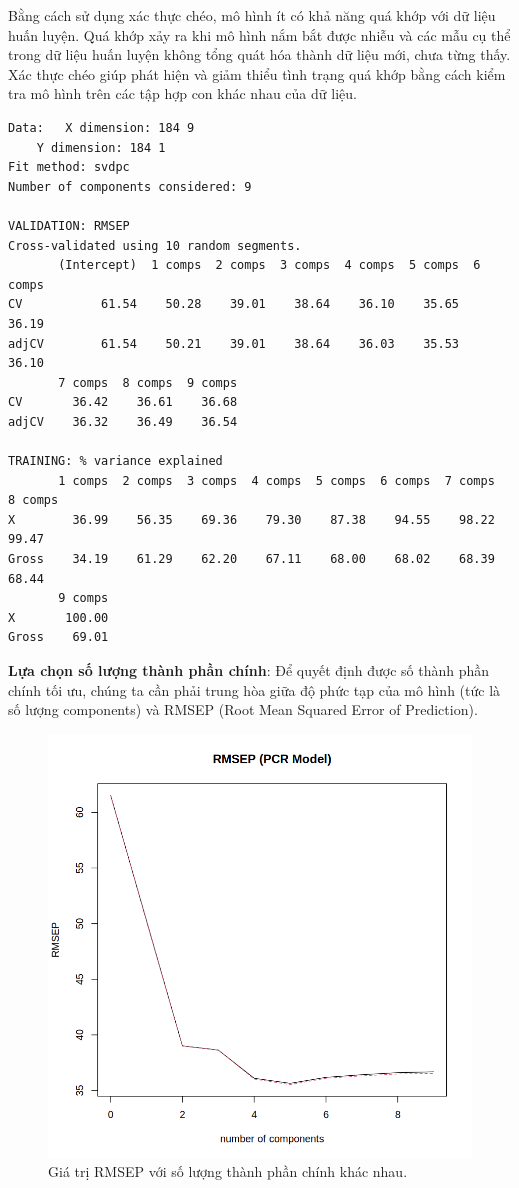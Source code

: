 Bằng cách sử dụng xác thực chéo, mô hình ít có khả năng quá khớp với dữ liệu huấn luyện. Quá khớp xảy ra khi mô hình nắm bắt được nhiễu và các mẫu cụ thể trong dữ liệu huấn luyện không tổng quát hóa thành dữ liệu mới, chưa từng thấy. Xác thực chéo giúp phát hiện và giảm thiểu tình trạng quá khớp bằng cách kiểm tra mô hình trên các tập hợp con khác nhau của dữ liệu.

\begin{lstlisting}
Data: 	X dimension: 184 9 
	Y dimension: 184 1
Fit method: svdpc
Number of components considered: 9

VALIDATION: RMSEP
Cross-validated using 10 random segments.
       (Intercept)  1 comps  2 comps  3 comps  4 comps  5 comps  6 comps
CV           61.54    50.28    39.01    38.64    36.10    35.65    36.19
adjCV        61.54    50.21    39.01    38.64    36.03    35.53    36.10
       7 comps  8 comps  9 comps
CV       36.42    36.61    36.68
adjCV    36.32    36.49    36.54

TRAINING: % variance explained
       1 comps  2 comps  3 comps  4 comps  5 comps  6 comps  7 comps  8 comps
X        36.99    56.35    69.36    79.30    87.38    94.55    98.22    99.47
Gross    34.19    61.29    62.20    67.11    68.00    68.02    68.39    68.44
       9 comps
X       100.00
Gross    69.01
\end{lstlisting}

\textbf{Lựa chọn số lượng thành phần chính}: Để quyết định được số thành phần chính tối ưu, chúng ta cần phải trung hòa giữa độ phức tạp của mô hình (tức là số lượng components) và RMSEP (Root Mean Squared Error of Prediction).

\begin{figure}[H]
    \centering
    \includegraphics[width=0.75\columnwidth]{csm_figures/pcr_part01.png}
    \caption{Giá trị RMSEP với số lượng thành phần chính khác nhau.}
    \label{fig:pcr_part01}
\end{figure}


